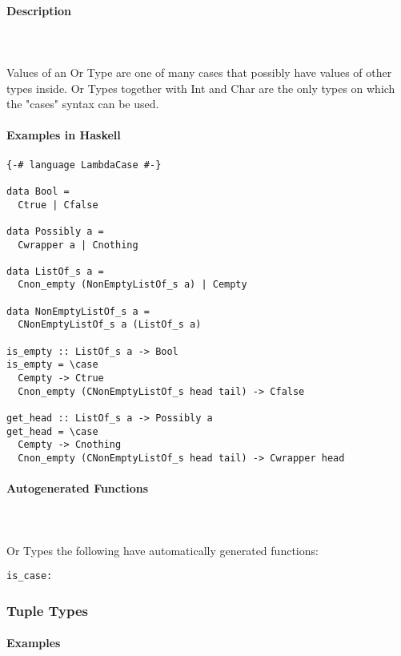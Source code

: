 \documentclass{article}
\def\H{Haskell}
\begin{document}
\paragraph{Description}\mbox{} \\\\
Values of an Or Type are one of many cases that possibly have values of other types
inside. Or Types together with Int and Char are the only types on which the "cases"
syntax can be used.

\paragraph{Examples in \H}

\begin{verbatim}
{-# language LambdaCase #-}

data Bool =
  Ctrue | Cfalse

data Possibly a =
  Cwrapper a | Cnothing

data ListOf_s a =
  Cnon_empty (NonEmptyListOf_s a) | Cempty

data NonEmptyListOf_s a =
  CNonEmptyListOf_s a (ListOf_s a)

is_empty :: ListOf_s a -> Bool
is_empty = \case
  Cempty -> Ctrue
  Cnon_empty (CNonEmptyListOf_s head tail) -> Cfalse

get_head :: ListOf_s a -> Possibly a
get_head = \case
  Cempty -> Cnothing
  Cnon_empty (CNonEmptyListOf_s head tail) -> Cwrapper head
\end{verbatim}

\paragraph{Autogenerated Functions}\mbox{} \\\\
Or Types the following have automatically generated functions:

\begin{verbatim}
is_case:
\end{verbatim}

\subsubsection{Tuple Types}

\paragraph{Examples}
\end{document}
